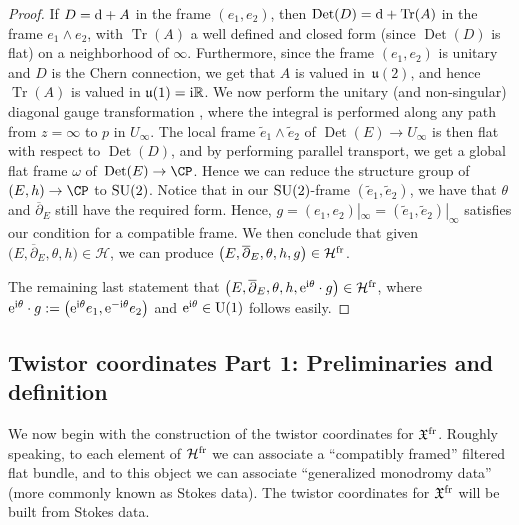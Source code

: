 \begin{proof}
If $D={\rm d}+A$ in the frame $(e_1,e_2)$, then $\operatorname{Det}(D)={\rm d}+\operatorname{Tr}(A)$ in the frame $e_1\wedge e_2$, with $\operatorname{Tr}(A)$ a well defined and closed form (since $\operatorname{Det}(D)$ is flat) on a neighborhood of $\infty$. Furthermore, since the frame $(e_1,e_2)$ is unitary and $D$ is the Chern connection, we get that $A$ is valued in~$\mathfrak{u}(2)$, and hence $\operatorname{Tr}(A)$ is valued in $\mathfrak{u}(1)={\rm i}\mathbb{R}$. We now perform the unitary (and non-singular) diagonal gauge transformation , where the integral is performed along any path from $z=\infty$ to $p$ in $U_{\infty}$. The local frame $\widetilde{e}_1\wedge \widetilde{e}_2$ of $\operatorname{Det}(E)\to U_{\infty}$ is then flat with respect to $\operatorname{Det}(D)$, and by performing parallel transport, we get a global flat frame $\omega$ of~${\operatorname{Det}(E)\to \CP}$. Hence we can reduce the structure group of $(E,h)\to \CP$ to ${\rm SU}(2)$. Notice that in our ${\rm SU}(2)$-frame $(\widetilde{e}_1,\widetilde{e}_2)$, we have that $\theta$ and $\overline{\partial}_E$ still have the required form. Hence, $g=(e_1,e_2)|_{\infty}=(\widetilde{e}_1,\widetilde{e}_2)|_{\infty}$ satisfies our condition for a compatible frame. We then conclude that given $\bigl(E,\overline{\partial}_E,\theta,h\bigr) \in \mathcal{H}$, we can produce $\bigl(E,\overline{\partial}_E,\theta,h,g\bigr)\in \mathcal{H}^{{\rm fr}}$.

The remaining last statement that $\bigl(E,\overline{\partial}_E,\theta,h, {\rm e}^{{\rm i}\theta}\cdot g\bigr)\in \mathcal{H}^{{\rm fr}}$, where ${\rm e}^{{\rm i}\theta}\cdot g:=\bigl({\rm e}^{{\rm i}\theta}e_1,{\rm e}^{-{\rm i}\theta}e_2\bigr)$ and ${\rm e}^{{\rm i}\theta}\in {\rm U}(1)$ follows easily.
\end{proof}

\subsection{Twistor coordinates Part 1: Preliminaries and definition}\label{sec3.4}

We now begin with the construction of the twistor coordinates for $\mathfrak{X}^{{\rm fr}}$. Roughly speaking, to each element of $\mathcal{H}^{{\rm fr}}$ we can associate a ``compatibly framed'' filtered flat bundle, and to this object we can associate ``generalized monodromy data'' (more commonly known as Stokes data). The twistor coordinates for $\mathfrak{X}^{{\rm fr}}$ will be built from Stokes data.

